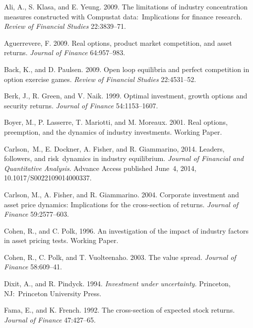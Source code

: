 \documentclass[nogrid,nosurname,sort&compress]{RFS}
\begin{document}
\begin{thebibliography}{}
Ali, A., S. Klasa, and E. Yeung. 2009. The limitations of industry concentration measures
constructed with Compustat data:\ Implications for finance research. \textit{Review of Financial
Studies} 22:3839--71.

 Aguerrevere, F. 2009. Real
options, product market competition, and asset returns. \textit{Journal of Finance} 64:957--983.

 Back, K., and D. Paulsen. 2009. Open
loop equilibria and perfect competition in option exercise games. \textit{%
Review of Financial Studies} 22:4531--52.

 Berk, J., R. Green, and V.
Naik. 1999. Optimal investment, growth options and security returns. \textit{%
Journal of Finance} 54:1153--1607.

 Boyer, M., P. Lasserre, T. Mariotti,
and M. Moreaux. 2001. Real options, preemption, and the dynamics of industry investments. Working
Paper.

 Carlson,\ M., E. Dockner, A.
Fisher, and R. Giammarino, 2014. Leaders, followers, and risk\ dynamics in industry equilibrium.
\textit{Journal of Financial and Quantitative Analysis}.  Advance Access published June~4, 2014,
10.1017/S0022109014000337.

 Carlson, M.,
A. Fisher, and R. Giammarino. 2004. Corporate investment and asset price dynamics: Implications
for the cross-section of returns. \textit{Journal of Finance} 59:2577--603.

 Cohen, R., and C. Polk, 1996. An
investigation of the impact of industry factors in asset pricing tests.
Working Paper.

 Cohen, R., C. Polk, and
T. Vuolteenaho. 2003. The value spread. \textit{Journal of Finance} 58:609--41.

 Dixit, A., and R. Pindyck. 1994.
\textit{Investment under uncertainty. }Princeton, NJ:\ Princeton University
Press.

 Fama, E., and K. French. 1992. The
cross-section of expected stock returns. \textit{Journal of Finance} 47:427--65.


\end{thebibliography}
\end{document}
